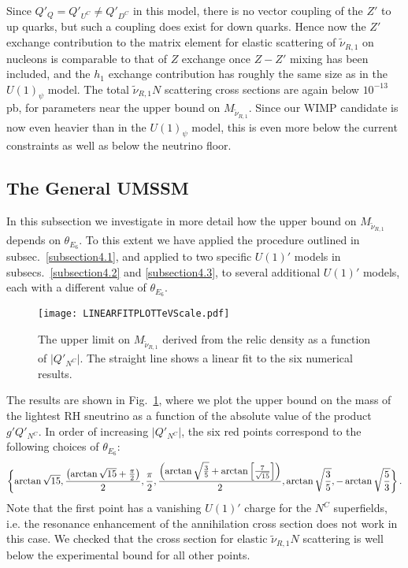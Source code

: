 \documentclass[a4paper,11pt]{article}
\begin{document}
Since $Q'_Q = Q'_{U^C} \neq Q'_{D^C}$ in this model, there is no
vector coupling of the $Z'$ to up quarks, but such a coupling does
exist for down quarks. Hence now the $Z'$ exchange contribution to the
matrix element for elastic scattering of $\tilde \nu_{R,1}$ on
nucleons is comparable to that of $Z$ exchange once $Z - Z'$ mixing
has been included, and the $h_1$ exchange contribution has roughly the
same size as in the $U(1)_\psi$ model. The total $\tilde \nu_{R,1} N$
scattering cross sections are again below $10^{-13}$ pb, for
parameters near the upper bound on $M_{\tilde \nu_{R,1}}$. Since our
WIMP candidate is now even heavier than in the $U(1)_\psi$ model, this
is even more below the current constraints as well as below the
neutrino floor.


\subsection{The General UMSSM}  
\label{subsection4.4}

In this subsection we investigate in more detail how the upper bound
on $M_{\tilde \nu_{R,1}}$ depends on $\theta_{E_6}$. To this extent we
have applied the procedure outlined in subsec.~\ref{subsection4.1},
and applied to two specific $U(1)'$ models in subsecs.~\ref{subsection4.2}
and \ref{subsection4.3}, to several additional $U(1)'$ models, each
with a different value of $\theta_{E_6}$.

\begin{figure}[h!]
\centering
\texttt{[image: LINEARFITPLOTTeVScale.pdf]}
\caption{The upper limit on $M_{\tilde \nu_{R,1}}$ derived from the
relic density as a function of $\vert Q'_{N^C} \vert$. The straight line shows a linear fit to the six numerical results.
\label{Fig5} }
\end{figure}

The results are shown in Fig.~\ref{Fig5}, where we plot the upper bound
on the mass of the lightest RH sneutrino as a function of the absolute value
of the product $g' Q'_{N^C}$. In order of increasing $\vert Q'_{N^C} \vert$, the 
six red points correspond to the following choices of $\theta_{E_{6}}$:
\[
\\ \biggl\{ \arctan\sqrt{15}, \frac{ \left( \arctan\sqrt{15} + \frac{\pi}{2}
\right) } {2}, \frac{\pi}{2}, \frac{ \left( \arctan\sqrt{\frac{3}{5}} + 
\arctan \left[ \frac{7} {\sqrt{15}} \right] \right) } {2} ,
\arctan\sqrt{\frac{3}{5}}, -\arctan\sqrt{\frac{5}{3}} \biggr\}\,.
\]
Note that the first point has a vanishing $U(1)'$ charge for the $N^C$
superfields, i.e. the resonance enhancement of the annihilation cross
section does not work in this case.  We checked that the cross section
for elastic $\tilde \nu_{R,1} N$ scattering is well below the
experimental bound for all other points.
\end{document}
